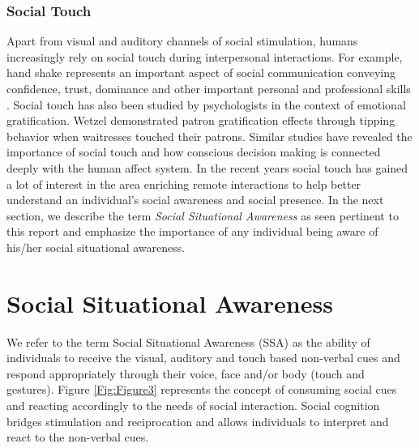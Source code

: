 \documentclass[oneside,11pt]{memoir}
\begin{document}
\subsubsection{Social Touch}
Apart from visual and auditory channels of social stimulation, humans increasingly rely on social touch during interpersonal interactions. For example, hand shake represents an important aspect of social communication conveying confidence, trust, dominance and other important personal and professional skills \cite{burgoon_relational_1984}. Social touch has also been studied by psychologists in the context of emotional gratification. Wetzel \cite{wetzel_midas_1984} demonstrated patron gratification effects through tipping behavior when waitresses touched their patrons. Similar studies have revealed the importance of social touch and how conscious decision making is connected deeply with the human affect system. In the recent years social touch has gained a lot of interest in the area enriching remote interactions \cite{haans_mediated_2006} \cite{bailenson_virtual_2008} to help better understand an individual's  social awareness and social presence. In the next section, we describe the term \emph{Social Situational Awareness} as seen pertinent to this report and emphasize the importance of any individual being aware of his/her social situational awareness.

\section{Social Situational Awareness}
We refer to the term Social Situational Awareness (SSA) as the ability of individuals to receive the visual, auditory and touch based non-verbal cues and respond appropriately through their voice, face and/or body (touch and gestures). Figure \ref{Fig:Figure3} represents the concept of consuming social cues and reacting accordingly to the needs of social interaction. Social cognition bridges stimulation and reciprocation and allows individuals to interpret and react to the non-verbal cues.
\end{document}
